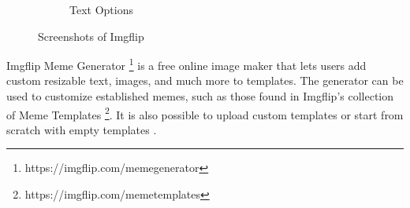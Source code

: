 \begin{figure}
\begin{subfigure}{0.4\textwidth}
        \caption{Text Options}
        \label{fig:imgflip-text-options}
    \end{subfigure}
    \caption{Screenshots of Imgflip}
    \label{fig:imgflip}
\end{figure}

Imgflip Meme Generator \footnote{https://imgflip.com/memegenerator} is a free online image maker that lets users add custom resizable text, images, and much more to templates. The generator can be used to customize established memes, such as those found in Imgflip's collection of Meme Templates \footnote{https://imgflip.com/memetemplates}. It is also possible to upload custom templates or start from scratch with empty templates \cite{imgflip}.

